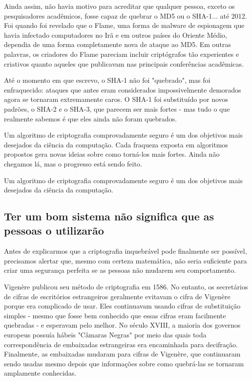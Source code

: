 \documentclass{book}
\begin{document}
Ainda assim, não havia motivo para acreditar que qualquer pessoa, exceto os pesquisadores acadêmicos, fosse capaz de quebrar o MD5 ou o SHA-1... até 2012. Foi quando foi revelado que o Flame, uma forma de malware de espionagem que havia infectado computadores no Irã e em outros países do Oriente Médio, dependia de uma forma completamente nova de ataque ao MD5. Em outras palavras, os criadores do Flame pareciam incluir criptógrafos tão experientes e criativos quanto aqueles que publicavam nas principais conferências acadêmicas.

Até o momento em que escrevo, o SHA-1 não foi "quebrado", mas foi enfraquecido: ataques que antes eram considerados impossivelmente demorados agora se tornaram extremamente caros. O SHA-1 foi substituído por novos padrões, o SHA-2 e o SHA-3, que parecem ser mais fortes - mas tudo o que realmente sabemos é que eles ainda não foram quebrados.

Um algoritmo de criptografia comprovadamente seguro é um dos objetivos mais desejados da ciência da computação. Cada fraqueza exposta em algoritmos propostos gera novas ideias sobre como torná-los mais fortes. Ainda não chegamos lá, mas o progresso está sendo feito.

Um algoritmo de criptografia comprovadamente seguro é um dos objetivos mais desejados da ciência da computação.


\subsection{Ter um bom sistema não significa que as pessoas o utilizarão}
\label{segredos:bom-sistema}

Antes de explicarmos que a criptografia inquebrável pode finalmente ser possível, precisamos alertar que, mesmo com certeza matemática, não seria suficiente para criar uma segurança perfeita se as pessoas não mudarem seu comportamento.

Vigenère publicou seu método de criptografia em 1586. No entanto, os secretários de cifras de escritórios estrangeiros geralmente evitavam o cifra de Vigenère porque era complicado de usar. Eles continuavam usando cifras de substituição simples - mesmo que fosse bem conhecido que essas cifras eram facilmente quebradas - e esperavam pelo melhor. No século XVIII, a maioria dos governos europeus possuía hábeis "Câmaras Negras" por meio das quais toda correspondência de embaixadas estrangeiras era encaminhada para decifração. Finalmente, as embaixadas mudaram para cifras de Vigenère, que continuaram sendo usadas mesmo depois que informações sobre como quebrá-las se tornaram amplamente conhecidas.
\end{document}
